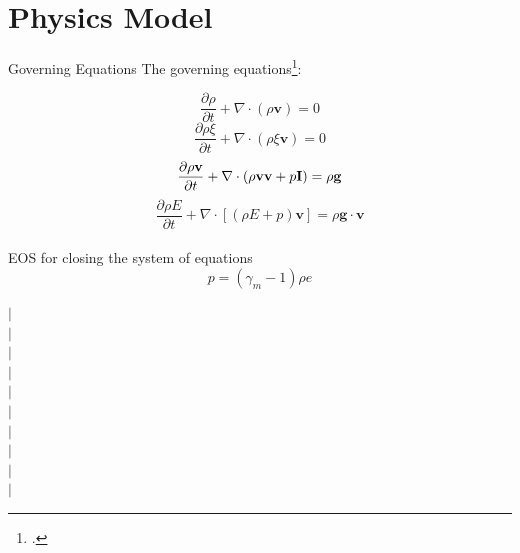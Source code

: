 \documentclass{beamer}
\begin{document}
\section{Physics Model}

\begin{frame}{Governing Equations}
The governing equations\footcite{suzuki2005numerical}:\\
\begin{minipage}{.505\textwidth}
\begin{equation}
\dfrac{\partial \rho}{\partial t} + \nabla \cdot \left(\rho \textbf{v}\right) = 0 \label{eq:gov-cs-rho}
\end{equation}
\begin{equation}
\dfrac{\partial \rho \xi}{\partial t} + \nabla \cdot \left(\rho \xi \textbf{v}\right) = 0 \label{eq:gov-cs-ks}
\end{equation}
\begin{equation}
\dfrac{\partial \rho \textbf{v}}{\partial t} + \nabla \cdot \left(\rho \textbf{v} \textbf{v} + p\textbf{I}\right) = \rho \textbf{g} \label{eq:gov-cs-v} \\
\end{equation}
\begin{equation}
\dfrac{\partial \rho E}{\partial t} + \nabla \cdot \left[\left(\rho E + p \right)\textbf{v}\right] = \rho \textbf{g} \cdot\textbf{v} \label{eq:gov-cs-e}
\end{equation}\\
EOS for closing the system of equations
\begin{equation}
p = \left(\gamma_m - 1\right)\rho e \label{eq:EOS}
\end{equation}
%
\end{minipage} %
%
\begin{minipage}{.01\textwidth}
$\vert$\\
$\vert$\\
$\vert$\\
$\vert$\\
$\vert$\\
$\vert$\\
$\vert$\\
$\vert$\\
$\vert$\\
$\vert$\\
\end{minipage}
\begin{minipage}{.46\textwidth}

\end{minipage}
\end{frame}
\end{document}
